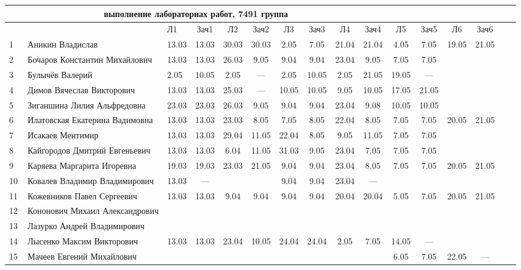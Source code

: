 \documentclass[a4paper,11pt]{article}
\begin{document}
\newpage
{}
\recalctypearea
\hspace{-6.1cm} %
\begin{tabular}{l|llccccccccccccc}
\multicolumn{10}{c}{выполнение лабораторнах работ, 7491 группа} \\
\toprule
&&Л1&Зач1& Л2&Зач2& Л3&Зач3& Л4&Зач4&  Л5&Зач5& Л6&Зач6&\\
\midrule
1\,&Аникин Владислав                &13.03&13.03 &30.03&30.03& 2.05& 7.05&21.04&21.04& 4.05& 7.05 &19.05&21.05\\
2\,&Бочаров Константин Михайлович   &13.03&13.03 &26.03& 9.05& 9.04& 9.04&23.04& 9.05& 7.05& 7.05\\
3\,&Булычёв Валерий                 & 2.05&10.05 & 2.05& --- & 2.05&10.05& 2.05&21.05&19.05& ---\\
4\,&Димов Вячеслав Викторович       &13.03&13.03 &25.03& --- &10.05&10.05& 9.05&10.05&17.05&21.05\\
5\,&Зиганшина Лилия Альфредовна     &23.03&23.03 &26.03& 9.05& 9.04& 9.04&23.04& 9.08&10.05&10.05\\
\midrule
6\,&Илатовская Екатерина Вадимовна  &13.03&13.03 &23.03& 8.05& 7.05& 8.05&22.04& 8.05& 7.05& 7.05&20.05&21.05\\
7\,&Исакаев Ментимир                &13.03&13.03 &29.04&11.05&22.04& 8.05& 9.05&11.05& 7.05& 7.05\\
8\,&Кайгородов Дмитрий Евгеньевич   &13.03&13.03 & 6.04&11.05&31.03& 9.05&23.04& 7.05& 7.05& 7.05\\
9\,&Каряева Маргарита Игоревна      &19.03&19.03 &23.03&21.05& 9.04& 9.04&23.04& 8.05& 7.05& 7.05&20.05&21.05\\
10\,&Ковалев Владимир Владимирович  &13.03& ---  &     &     & 9.04& 9.04&23.04& --- & &\\
\midrule
11\,&Кожевников Павел Сергеевич     &13.03&13.03 & 9.04& 9.04& 9.04& 9.04&20.04&20.04& 5.05& 7.05&20.05&21.05\\
12\,&Кононович Михаил Александрович &     &      &     &     &     &     &     &\\
13\,&Лазурко Андрей Владимирович    &     &      &     &     &     &     &     &\\
14\,&Лысенко Максим Викторович      &13.03&13.03 &23.04&10.05&24.04&24.04& 2.05& 7.05&14.05& --- \\
15\,&Мачеев Евгений Михайлович      &     &      &     &     &     &     &     &     & 6.05& 7.05&22.05& ---\\

\end{tabular}
\end{document}
